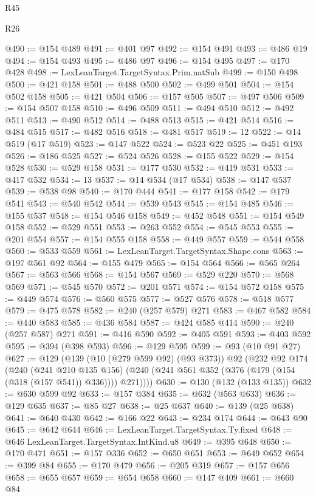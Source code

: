 \begin{lexlean}{R45}
\begin{lexlean}{R26}
\begin{coremodule}
{{{{{{{{{{{{{{{{{{{{{{{{{{{{{{{{{{{{{{{{{{{{{{{{{{{{{{{{{{{{{{{{{{{{{{{{@490 := @154 @489
@491 := @401 @97
@492 := @154 @491
@493 := @486 @19
@494 := @154 @493
@495 := @486 @97
@496 := @154 @495
@497 := @170 @428
@498 := LexLeanTarget.TargetSyntax.Prim.natSub
@499 := @150 @498
@500 := @421 @158
@501 := @488 @500
@502 := @499 @501
@504 := @154 @502 @158
@505 := @421 @504
@506 := @157 @505
@507 := @497 @506
@509 := @154 @507 @158
@510 := @496 @509
@511 := @494 @510
@512 := @492 @511
@513 := @490 @512
@514 := @488 @513
@515 := @421 @514
@516 := @484 @515
@517 := @482 @516
@518 := @481 @517
@519 := 12
@522 := @14 @519 (@17 @519)
@523 := @147 @522
@524 := @523 @22
@525 := @451 @193
@526 := @186 @525
@527 := @524 @526
@528 := @155 @522
@529 := @154 @528
@530 := @529 @158
@531 := @177 @530
@532 := @419 @531
@533 := @417 @532
@534 := 13
@537 := @14 @534 (@17 @534)
@538 := @147 @537
@539 := @538 @98
@540 := @170 @444
@541 := @177 @158
@542 := @179 @541
@543 := @540 @542
@544 := @539 @543
@545 := @154 @485
@546 := @155 @537
@548 := @154 @546 @158
@549 := @452 @548
@551 := @154 @549 @158
@552 := @529 @551
@553 := @263 @552
@554 := @545 @553
@555 := @201 @554
@557 := @154 @555 @158
@558 := @449 @557
@559 := @544 @558
@560 := @533 @559
@561 := LexLeanTarget.TargetSyntax.Shape.cons
@563 := @197 @561 @92
@564 := @155 @479
@565 := @154 @564
@566 := @565 @264
@567 := @563 @566
@568 := @154 @567
@569 := @529 @220
@570 := @568 @569
@571 := @545 @570
@572 := @201 @571
@574 := @154 @572 @158
@575 := @449 @574
@576 := @560 @575
@577 := @527 @576
@578 := @518 @577
@579 := @475 @578
@582 := @240 (@257 @579) @271
@583 := @467 @582
@584 := @440 @583
@585 := @436 @584
@587 := @424 @585 @414
@590 := @240 (@257 @587) @271
@591 := @416 @590
@592 := @405 @591
@593 := @403 @592
@595 := @394 (@398 @593)
@596 := @129 @595
@599 := @93 (@10 @91 @27)
@627 := @129
    (@139
      (@10 (@279 @599 @92) (@93 @373))
      @92
      (@232
        @92
        @174
        (@240
          (@241 @210 @135 @156)
          (@240 (@241 @561 @352 (@376 (@179 (@154 (@318 (@157 @541)) @336)))) @271))))
@630 := @130 (@132 (@133 @135))
@632 := @630 @599 @92
@633 := @157 @384
@635 := @632 (@563 @633)
@636 := @129 @635
@637 := @85 @27
@638 := @25 @637
@640 := @139 (@25 @638)
@641 := @640 @430
@642 := @166 @22
@643 := @234 @174
@644 := @643 @90
@645 := @642 @644
@646 := LexLeanTarget.TargetSyntax.Ty.fixed
@648 := @646 LexLeanTarget.TargetSyntax.IntKind.u8
@649 := @395 @648
@650 := @170 @471
@651 := @157 @336
@652 := @650 @651
@653 := @649 @652
@654 := @399 @84
@655 := @170 @479
@656 := @205 @319
@657 := @157 @656
@658 := @655 @657
@659 := @654 @658
@660 := @147 @409
@661 := @660 @84
}}}}}}}}}}}}}}}}}}}}}}}}}}}}}}}}}}}}}}}}}}}}}}}}}}}}}}}}}}}}}}}}}}}}}}}}
\end{coremodule}
\end{lexlean}
\end{lexlean}
